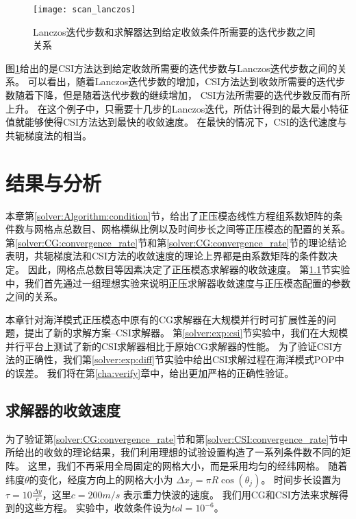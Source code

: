 \begin {figure}%
\centering
\texttt{[image: scan\_lanczos]}
\caption[] {Lanczos迭代步数和求解器达到给定收敛条件所需要的迭代步数之间关系\label{fig:lanczos_iter}}
\end{figure}
图\ref{fig:lanczos_iter}给出的是CSI方法达到给定收敛所需要的迭代步数与Lanczos迭代步数之间的关系。
可以看出，随着Lanczos迭代步数的增加，CSI方法达到收敛所需要的迭代步数随着下降，但是随着迭代步数的继续增加， CSI方法所需要的迭代步数反而有所上升。 
在这个例子中，只需要十几步的Lanczos迭代，所估计得到的最大最小特征值就能够使得CSI方法达到最快的收敛速度。
在最快的情况下，CSI的迭代速度与共轭梯度法的相当。


\section{结果与分析} 
\label{solver:exp}

本章第\ref{solver:Algorithm:condition}节，给出了正压模态线性方程组系数矩阵的条件数与网格点总数目、网格横纵比例以及时间步长之间等正压模态的配置的关系。
第\ref{solver:CG:convergence_rate}节和第\ref{solver:CG:convergence_rate}节的理论结论表明，共轭梯度法和CSI方法的收敛速度的理论上界都是由系数矩阵的条件数决定。
因此，网格点总数目等因素决定了正压模态求解器的收敛速度。
第\ref{solver:exp:ideal}节实验中，我们首先通过一组理想实验来说明正压求解器收敛速度与正压模态配置的参数之间的关系。 

本章针对海洋模式正压模态中原有的CG求解器在大规模并行时可扩展性差的问题，提出了新的求解方案--CSI求解器。
第\ref{solver:exp:csi}节实验中，我们在大规模并行平台上测试了新的CSI求解器相比于原始CG求解器的性能。
为了验证CSI方法的正确性，我们第\ref{solver:exp:diff}节实验中给出CSI求解过程在海洋模式POP中的误差。
我们将在第\ref{cha:verify}章中，给出更加严格的正确性验证。 



\subsection{求解器的收敛速度}\label{solver:exp:ideal}

为了验证第\ref{solver:CG:convergence_rate}节和第\ref{solver:CSI:convergence_rate}节中所给出的收敛的理论结果，我们利用理想的试验设置构造了一系列条件数不同的矩阵。
这里，我们不再采用全局固定的网格大小，而是采用均匀的经纬网格。
随着纬度$\theta$的变化，经度方向上的网格大小为 $\Delta x_j  = \pi R \cos (\theta_j)$。
时间步长设置为$\tau = 10\frac{\Delta y}{c}$，这里$c = 200m/s$ 表示重力快波的速度\cite{smith2010parallel}。 
我们用CG和CSI方法来求解得到的这些方程。
实验中，收敛条件设为$tol = 10^{-6}$。 
  

